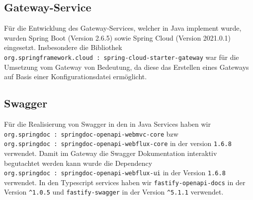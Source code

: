 \subsection{Gateway-Service}

Für die Entwicklung des Gateway-Services, welcher in Java implement wurde, wurden Spring Boot (Version 2.6.5) sowie Spring Cloud (Version 2021.0.1) eingesetzt.
Insbesondere die Bibliothek \\ \verb|org.springframework.cloud : spring-cloud-starter-gateway| war für die Umsetzung vom Gateway von Bedeutung, da diese das Erstellen eines Gateways auf Basis einer Konfigurationsdatei ermöglicht.

\subsection{Swagger}

Für die Realisierung von Swagger in den in Java Services haben wir \\ \verb|org.springdoc : springdoc-openapi-webmvc-core| bzw \\ \verb|org.springdoc : springdoc-openapi-webflux-core| in der version \verb|1.6.8| verwendet.  Damit im Gateway die Swagger Dokumentation interaktiv begutachtet werden kann wurde die Dependency \\ \verb|org.springdoc : springdoc-openapi-webflux-ui| in der Version \verb*|1.6.8| verwendet.
 In den Typescript services haben wir \verb|fastify-openapi-docs| in der Version \verb|^1.0.5| und \verb|fastify-swagger| in der Version \verb|^5.1.1| verwendet.